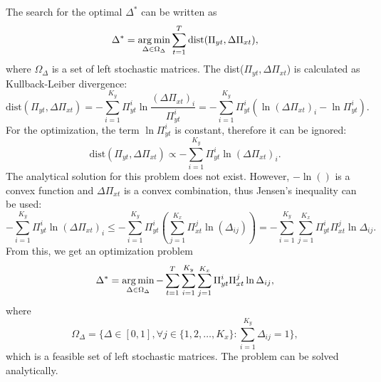 The search for the optimal $\Delta^{*}$ can be written as
\begin{equation}
    \Delta^* = \operatorname*{arg\,min}_{\Delta \in \Omega_{\Delta}} \sum_{t=1}^T \text{dist}(\Pi_{yt}, \Delta\Pi_{xt}),
\end{equation}
where $\Omega_{\Delta}$ is a set of left stochastic matrices. The dist($\Pi_{yt}, \Delta\Pi_{xt}$) is calculated as Kullback-Leiber divergence\cite{Kullback1951}:
\begin{equation}
    \text{dist}(\Pi_{yt}, \Delta\Pi_{xt}) = - \sum_{i=1}^{K_y} \Pi_{yt}^i \ln\frac{(\Delta\Pi_{xt})_i}{\Pi_{yt}^i} = - \sum_{i=1}^{K_y} \Pi_{yt}^i (\ln (\Delta\Pi_{xt})_i - \ln \Pi_{yt}^i).
\end{equation}
For the optimization, the term $\ln \Pi_{yt}^i$ is constant, therefore it can be ignored:
\begin{equation}
    \text{dist}(\Pi_{yt}, \Delta\Pi_{xt}) \propto - \sum_{i=1}^{K_y} \Pi_{yt}^i \ln (\Delta\Pi_{xt})_i.
\end{equation}
The analytical solution for this problem does not exist. However, $-\ln()$ is a convex function and $\Delta\Pi_{xt}$ is a convex combination, thus Jensen's inequality can be used:
\begin{equation}
    - \sum_{i=1}^{K_y} \Pi_{yt}^i \ln (\Delta\Pi_{xt})_i \leq - \sum_{i=1}^{K_y} \Pi_{yt}^i ( \sum_{j=1}^{K_x} \Pi_{xt}^j \ln (\Delta_{ij}) ) = - \sum_{i=1}^{K_y} \sum_{j=1}^{K_x} \Pi_{yt}^i \Pi_{xt}^j \ln \Delta_{ij}.
\end{equation}
From this, we get an optimization problem
\begin{equation}
    \Delta^* = \operatorname*{arg\,min}_{\Delta \in \Omega_{\Delta}} - \sum_{t=1}^T \sum_{i=1}^{K_y} \sum_{j=1}^{K_x} \Pi_{yt}^i \Pi_{xt}^j \ln \Delta_{ij},
\end{equation}
where
\begin{equation}
    \Omega_{\Delta} = \{ \Delta \in [0, 1], \forall j \in \{ 1, 2, \dots, K_x \} : \sum_{i=1}^{K_y} \Delta_{ij} = 1 \},
\end{equation}
which is a feasible set of left stochastic matrices. The problem can be solved analytically.

